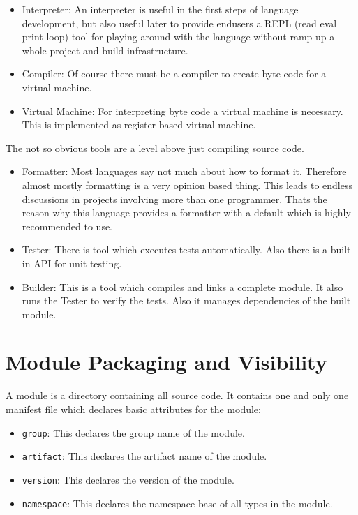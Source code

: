 \documentclass[11pt,a4paper]{report}
\begin{document}
\begin{itemize}
    \item Interpreter: An interpreter is useful in the first steps of language development, but also useful later to provide endusers a REPL (read eval print loop) tool for playing around with the language without ramp up a whole project and build infrastructure.
    \item Compiler: Of course there must be a compiler to create byte code for a virtual machine.
    \item Virtual Machine: For interpreting byte code a virtual machine is necessary. This is implemented as register based virtual machine.
\end{itemize}

The not so obvious tools are a level above just compiling source code.

\begin{itemize}
    \item Formatter: Most languages say not much about how to format it. Therefore almost mostly formatting is a very opinion based thing. This leads to endless discussions in projects involving more than one programmer. Thats the reason why this language provides a formatter with a default which is highly recommended to use.
    \item Tester: There is tool which executes tests automatically. Also there is a built in API for unit testing.
    \item Builder: This is a tool which compiles and links a complete module. It also runs the Tester to verify the tests. Also it manages dependencies of the built module.
\end{itemize}

\section{Module Packaging and Visibility}

A module is a directory containing all source code. It contains one and only one manifest file which declares basic attributes for the module:

\begin{itemize}
    \item \texttt{group}: This declares the group name of the module.
    \item \texttt{artifact}: This declares the artifact name of the module.
    \item \texttt{version}: This declares the version of the module.
    \item \texttt{namespace}: This declares the namespace base of all types in the module.
\end{itemize}
\end{document}
